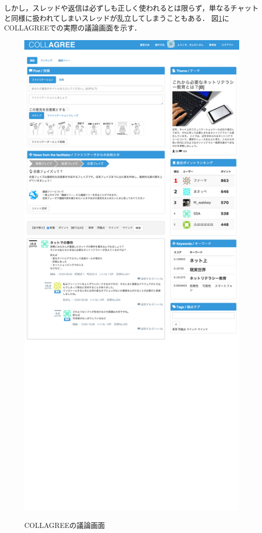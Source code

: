 しかし，スレッドや返信は必ずしも正しく使われるとは限らず，単なるチャットと同様に扱われてしまいスレッドが乱立してしまうこともある．%
図\ref{Fig:collagreeDiscuss}にCOLLAGREEでの実際の議論画面を示す．
\begin{figure}[htbp]
 \begin{center}
 \caption{COLLAGREEの議論画面}
  \includegraphics[width=\textwidth]{../images/2.Related_Work/COLLAGREE_Discuss-min.png}
  \label{Fig:collagreeDiscuss}
  \vspace{-10pt}
 \end{center}
\end{figure}

